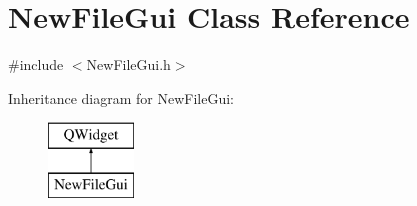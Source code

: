 \hypertarget{class_new_file_gui}{\section{New\-File\-Gui Class Reference}
\label{class_new_file_gui}
}


{\ttfamily \#include $<$New\-File\-Gui.\-h$>$}

Inheritance diagram for New\-File\-Gui\-:\begin{figure}[H]
\begin{center}
\leavevmode
\includegraphics[height=2.000000cm]{class_new_file_gui}
\end{center}
\end{figure}
